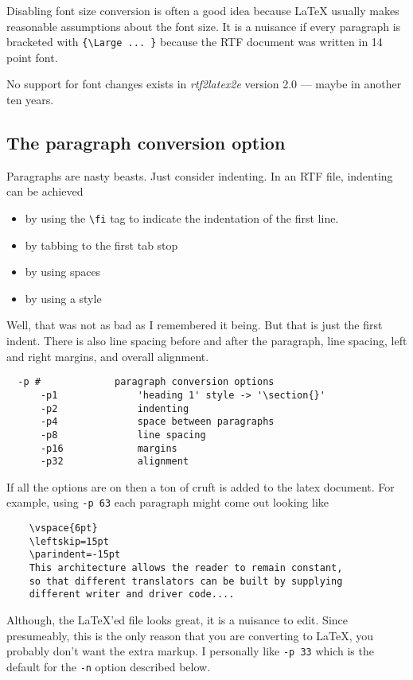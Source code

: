 \documentclass{article}
\def\rtf2latex2e{{\it rtf2latex2e}}
\begin{document}
Disabling font size conversion is often a good idea because
\LaTeX{} usually makes reasonable assumptions about the font size.
It is a nuisance if every paragraph is bracketed with 
\verb#{\Large ... }# because the RTF document was written in 
14 point font.

No support for font changes exists in \rtf2latex2e{} version 2.0
--- maybe in another ten years.

\subsection{The paragraph conversion option}

Paragraphs are nasty beasts.  Just consider indenting.  In an RTF
file, indenting can be achieved
\begin{itemize}
\item by using the \verb#\fi# tag to 
indicate the indentation of the first line.  
\item by tabbing to the first tab stop
\item by using spaces
\item by using a style
\end{itemize}
Well, that was not as bad as I remembered it being.  But that is just
the first indent.  There is also line spacing before and after the paragraph,
line spacing, left and right margins, and overall alignment.  
\begin{verbatim}
  -p #             paragraph conversion options
      -p1              'heading 1' style -> '\section{}'
      -p2              indenting
      -p4              space between paragraphs
      -p8              line spacing
      -p16             margins
      -p32             alignment
\end{verbatim}
If all the options are on then a ton of cruft is added to the latex document.
For example, using \texttt{-p 63} each paragraph might come out looking like
\begin{verbatim}
    \vspace{6pt}
    \leftskip=15pt
    \parindent=-15pt
    This architecture allows the reader to remain constant, 
    so that different translators can be built by supplying 
    different writer and driver code....
\end{verbatim}
Although, the \LaTeX{}'ed file looks great, it is a nuisance to
edit.  Since presumeably, this is the only reason that you are 
converting to \LaTeX{}, you probably don't want the extra markup.
I personally like \texttt{-p 33} which is the default for the 
\texttt{-n} option described below.
\end{document}
